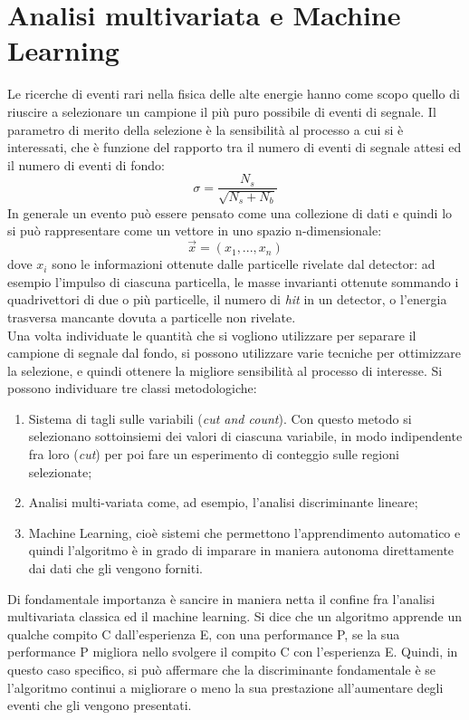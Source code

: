 \section{Analisi multivariata e Machine Learning}
\label{analisi multivariata e ML}

Le ricerche di eventi rari nella fisica delle alte energie hanno come scopo quello di riuscire a selezionare un campione il più puro possibile di eventi di segnale. Il parametro di merito della selezione è la sensibilità al processo a cui si è interessati, che è funzione del rapporto tra il numero di eventi di segnale attesi ed il numero di eventi di fondo: 
\begin{equation}
	\sigma = \frac{N_s}{\sqrt{N_s + N_b}}
\end{equation}
In generale un evento può essere pensato come una collezione di dati e quindi lo si può rappresentare come un vettore in uno spazio n-dimensionale: 
\begin{equation}
\vec{x} = (x_{1},...,x_{n})
\end{equation}
dove $x_i$ sono le informazioni ottenute dalle particelle rivelate dal detector: ad esempio l'impulso di ciascuna particella, le masse invarianti ottenute sommando i quadrivettori di due o più particelle, il numero di \textit{hit} in un detector, o l'energia trasversa mancante dovuta a particelle non rivelate. \\
Una volta individuate le quantità che si vogliono utilizzare per separare il campione di segnale dal fondo, si possono utilizzare varie tecniche per ottimizzare la selezione, e quindi ottenere la migliore sensibilità al processo di interesse. Si possono individuare tre classi metodologiche:

\begin{enumerate}
	\item Sistema di tagli sulle variabili (\textit{cut and count}). Con questo metodo si selezionano sottoinsiemi dei valori di ciascuna variabile, in modo indipendente fra loro (\textit{cut}) per poi fare un esperimento di conteggio sulle regioni selezionate;
	\item Analisi multi-variata come, ad esempio, l'analisi discriminante lineare;
	\item Machine Learning, cioè sistemi che permettono l'apprendimento automatico e quindi l'algoritmo è in grado di imparare in maniera autonoma direttamente dai dati che gli vengono forniti.
\end{enumerate}
Di fondamentale importanza è sancire in maniera netta il confine fra l'analisi multivariata classica ed il machine learning. Si dice che un algoritmo apprende un qualche compito C dall'esperienza E, con una performance P, se la sua performance P migliora nello svolgere il compito C con l'esperienza E. Quindi, in questo caso specifico, si può affermare che la discriminante fondamentale è se l'algoritmo continui a migliorare o meno la sua prestazione all'aumentare degli eventi che gli vengono presentati.

